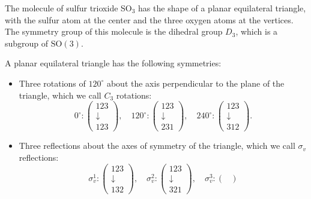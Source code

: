 \begin{example}
    The molecule of sulfur trioxide SO\(_3\) has the shape of a planar equilateral triangle, with the sulfur atom at the center and the three oxygen atoms at the vertices. The symmetry group of this molecule is the dihedral group \(D_3\), which is a subgroup of \(\mathrm{SO}(3)\).

    A planar equilateral triangle has the following symmetries:
    \begin{itemize}
        \item Three rotations of \(120^{\circ}\) about the axis perpendicular to the plane of the triangle, which we call \(C_3\) rotations:
              \[
                  0^{\circ} : \begin{pmatrix}
                      123        \\
                      \downarrow \\
                      123
                  \end{pmatrix}, \quad 120^{\circ} : \begin{pmatrix}
                      123        \\
                      \downarrow \\
                      231
                  \end{pmatrix}, \quad 240^{\circ} : \begin{pmatrix}
                      123        \\
                      \downarrow \\
                      312
                  \end{pmatrix}.
              \]
        \item Three reflections about the axes of symmetry of the triangle, which we call \(\sigma_v\) reflections:
              \[
                  \sigma_v^1 : \begin{pmatrix}
                      123        \\
                      \downarrow \\
                      132
                  \end{pmatrix}, \quad \sigma_v^2 : \begin{pmatrix}
                      123        \\
                      \downarrow \\
                      321
                  \end{pmatrix}, \quad \sigma_v^3 : \begin{pmatrix}

\end{pmatrix}\]
\end{itemize}
\end{example}

